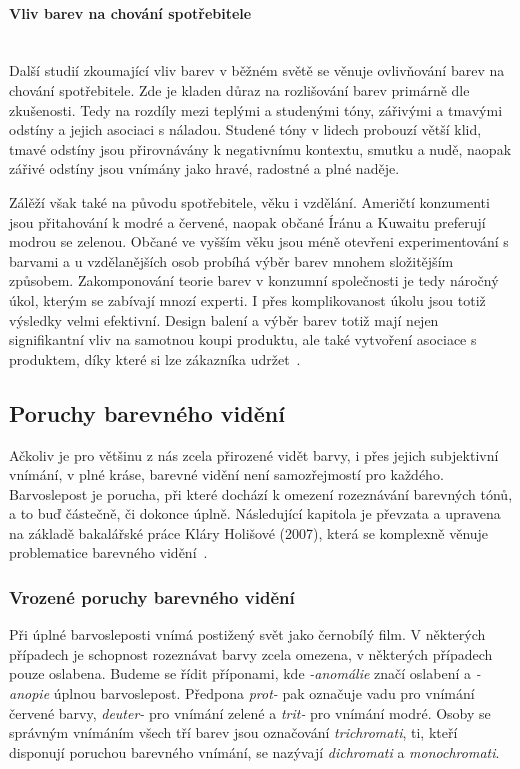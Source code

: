 \paragraph{Vliv barev na chování spotřebitele}\mbox{}\\
Další studií zkoumající vliv barev v běžném světě se věnuje ovlivňování barev na chování spotřebitele. Zde je kladen důraz na rozlišování
barev primárně dle zkušenosti. Tedy na rozdíly mezi teplými a studenými tóny, zářivými a tmavými odstíny a jejich asociaci s náladou. 
Studené tóny v lidech probouzí větší klid, tmavé odstíny jsou přirovnávány k negativnímu kontextu, smutku a nudě, naopak zářivé odstíny jsou vnímány jako hravé, 
radostné a plné naděje.

Zálěží však také na původu spotřebitele, věku i vzdělání. Američtí konzumenti jsou přitahování k modré a červené, naopak občané Íránu a Kuwaitu
preferují modrou se zelenou. Občané ve vyšším věku jsou méně otevřeni experimentování s barvami a u vzdělanějších osob probíhá výběr barev mnohem složitějším
způsobem. Zakomponování teorie barev v konzumní společnosti je tedy náročný úkol, kterým se zabívají mnozí experti. I přes komplikovanost úkolu
jsou totiž výsledky velmi efektivní. Design balení a výběr barev totiž mají nejen signifikantní vliv na samotnou koupi produktu, ale také vytvoření asociace
s produktem, díky které si lze zákazníka udržet~\cite{consumer-behavior}.

\subsection{Poruchy barevného vidění}
Ačkoliv je pro většinu z nás zcela přirozené vidět barvy, i přes jejich subjektivní vnímání, v plné kráse, barevné vidění není samozřejmostí pro každého.
Barvoslepost je porucha, při které dochází k omezení rozeznávání barevných tónů, a to buď částečně, či dokonce úplně. Následující kapitola je převzata a upravena na 
základě bakalářské práce Kláry Holišové (2007), která se komplexně věnuje problematice barevného vidění~\cite{Holisova2007thesis}.

\subsubsection{Vrozené poruchy barevného vidění}
Při úplné barvosleposti vnímá postižený svět jako černobílý film. V některých případech je schopnost rozeznávat barvy zcela omezena, v některých případech pouze oslabena.
Budeme se řídit příponami, kde \emph{-anomálie} značí oslabení a \emph{-anopie} úplnou barvoslepost. Předpona \emph{prot-} pak označuje vadu pro vnímání červené barvy, \emph{deuter-} pro vnímání zelené a \emph{trit- }
pro vnímání modré. Osoby se správným vnímáním všech tří barev jsou označování \emph{trichromati}, ti, kteří disponují poruchou barevného vnímání, se nazývají \emph{dichromati} a \emph{monochromati}.
